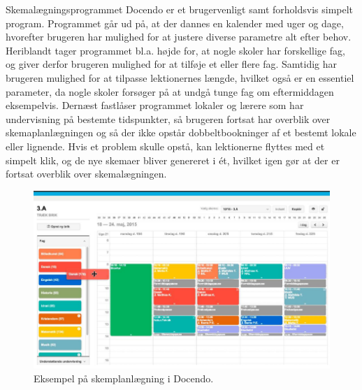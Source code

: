 Skemalægningsprogrammet Docendo er et brugervenligt samt forholdsvis simpelt program. Programmet går ud på, at der dannes en kalender med uger og dage, hvorefter brugeren har mulighed for at justere diverse parametre alt efter behov. Heriblandt tager programmet bl.a. højde for, at nogle skoler har forskellige fag, og giver derfor brugeren mulighed for at tilføje et eller flere fag. Samtidig har brugeren mulighed for at tilpasse lektionernes længde, hvilket også er en essentiel parameter, da nogle skoler forsøger på at undgå tunge fag om eftermiddagen eksempelvis. Dernæst fastlåser programmet lokaler og lærere som har undervisning på bestemte tidspunkter, så brugeren fortsat har overblik over skemaplanlægningen og så der ikke opstår dobbeltbookninger af et bestemt lokale eller lignende. Hvis et problem skulle opstå, kan lektionerne flyttes med et simpelt klik, og de nye skemaer bliver genereret i ét, hvilket igen gør at der er fortsat overblik over skemalægningen\cite{docendo}.
\begin{figure}[!h]
  \centering
  \includegraphics[width=\textwidth]{partials/graphics/docendo.png}
    \caption{Eksempel på skemplanlægning i Docendo\cite{docendob}.}
  \label{fig:docendo}
\end{figure}

